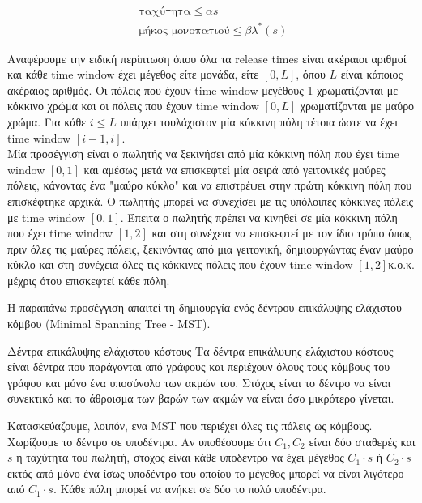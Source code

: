 \documentclass[oneside,12pt]{book}
\theoremstyle{definition}
\begin{document}
\begin{align}
	\text{ ταχύτητα} \leq αs \\
	\text{ μήκος μονοπατιού} \leq βλ^{*}(s)
\end{align}

Αναφέρουμε την ειδική περίπτωση όπου όλα τα release times είναι ακέραιοι αριθμοί και κάθε time window έχει μέγεθος είτε μονάδα, είτε \([0,L]\), όπου \(L\) είναι κάποιος ακέραιος αριθμός. Οι πόλεις που έχουν time window μεγέθους 1 χρωματίζονται με κόκκινο χρώμα και οι πόλεις που έχουν time window \([0,L]\) χρωματίζονται με μαύρο χρώμα. Για κάθε \(i \leq L\) υπάρχει τουλάχιστον μία κόκκινη πόλη τέτοια ώστε να έχει time window \([i-1,i]\). \\

Μία προσέγγιση είναι ο πωλητής να ξεκινήσει από μία κόκκινη πόλη που έχει time window \([0,1]\) και αμέσως μετά να επισκεφτεί μία σειρά από γειτονικές μαύρες πόλεις, κάνοντας ένα "μαύρο κύκλο" και να επιστρέψει στην πρώτη κόκκινη πόλη που επισκέφτηκε αρχικά. Ο πωλητής μπορεί να συνεχίσει με τις υπόλοιπες κόκκινες πόλεις με time window \([0,1]\). Έπειτα ο πωλητής πρέπει να κινηθεί σε μία κόκκινη πόλη που έχει time window \([1,2]\) και στη συνέχεια να επισκεφτεί με τον ίδιο τρόπο όπως πριν όλες τις μαύρες πόλεις, ξεκινόντας από μια γειτονική, δημιουργώντας έναν μαύρο κύκλο και στη συνέχεια όλες τις κόκκινες πόλεις που έχουν time window \([1,2]\)κ.ο.κ. μέχρις ότου επισκεφτεί κάθε πόλη.  

Η παραπάνω προσέγγιση απαιτεί τη δημιουργία ενός δέντρου επικάλυψης ελάχιστου κόμβου (Minimal Spanning Tree - MST). \\

\begin{mydefinition}{Δέντρα επικάλυψης ελάχιστου κόστους}{}
	Τα δέντρα επικάλυψης ελάχιστου κόστους είναι δέντρα που παράγονται από γράφους και περιέχουν όλους τους κόμβους του γράφου και μόνο ένα υποσύνολο των ακμών του. Στόχος είναι το δέντρο να είναι συνεκτικό και το άθροισμα των βαρών των ακμών να είναι όσο μικρότερο γίνεται.
\end{mydefinition}

Κατασκεύαζουμε, λοιπόν, ενα MST που περιέχει όλες τις πόλεις ως κόμβους. Χωρίζουμε το δέντρο σε υποδέντρα. Αν υποθέσουμε ότι \(C_1, C_2\) είναι δύο σταθερές και \(s\) η ταχύτητα του πωλητή, στόχος είναι κάθε υποδέντρο να έχει μέγεθος \(C_1 \cdot s\) ή \(C_2 \cdot s\) εκτός από μόνο ένα ίσως υποδέντρο του οποίου το μέγεθος μπορεί να είναι λιγότερο από \(C_1 \cdot s\). Κάθε πόλη μπορεί να ανήκει σε δύο το πολύ υποδέντρα. \\
\end{document}
